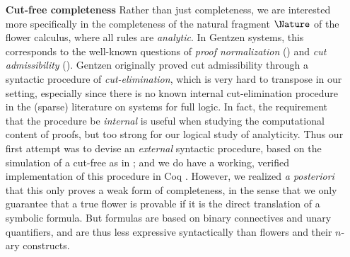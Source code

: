 \begin{itemize}
  \item[\textbf{Cut-free completeness}]
    Rather than just completeness, we are interested more specifically in the
    completeness of the natural fragment $\Nature$ of the flower calculus, where
    all rules are \emph{analytic}. In Gentzen systems, this corresponds to the
    well-known questions of \emph{proof normalization} () and
    \emph{cut admissibility} (). Gentzen originally proved cut
    admissibility through a syntactic procedure of \emph{cut-elimination}, which
    is very hard to transpose in our  setting, especially since
    there is no known internal cut-elimination procedure in the (sparse)
    literature on  systems for full  logic. In fact,
    the requirement that the procedure be \emph{internal} is useful when
    studying the computational content of proofs, but too strong for our logical
    study of analyticity. Thus our first attempt was to devise an
    \emph{external} syntactic procedure, based on the simulation of a cut-free
     as in ; and we do have a working,
    verified implementation of this procedure in Coq \cite{flowers-metatheory}.
    However, we realized \textit{a posteriori} that this only proves a weak form
    of completeness, in the sense that we only guarantee that a true flower is
    provable if it is the direct translation of a symbolic formula. But formulas
    are based on binary connectives and unary quantifiers, and are thus less
    expressive syntactically than flowers and their $n$-ary constructs.


\end{itemize}
